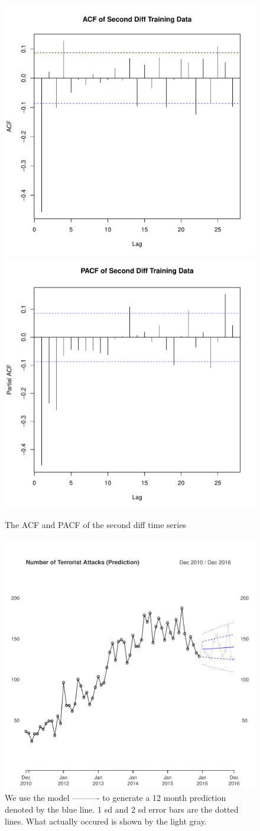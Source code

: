 \documentclass[font=12pt]{paper}
\begin{document}
\begin{figure}
\centering
\includegraphics[width=0.45\linewidth]{../image/acf_second_diff.pdf}
\includegraphics[width=0.45\linewidth]{../image/pacf_second_diff.pdf}
\caption{The ACF and PACF of the second diff time series}
\label{second_acf_pacf}
\end{figure}

\begin{figure}
\centering
\includegraphics[width=0.75\linewidth]{../image/prediction_on_testing.pdf}
\caption{We use the model ---------- to generate a 12 month prediction denoted by the blue line. 1 sd and 2 sd error bars are the dotted lines. What actually occured is shown by the light gray.}
\label{prediction}
\end{figure}
\end{document}
